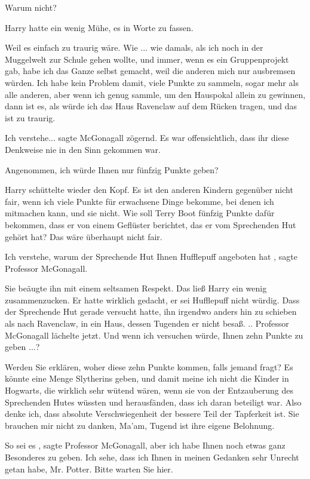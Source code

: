 \glqq Warum nicht?\grqq{}

Harry hatte ein wenig Mühe, es in Worte zu fassen.

\glqq Weil es einfach zu traurig wäre. Wie ... wie damals, als ich noch in der
Muggelwelt zur Schule gehen wollte, und immer, wenn es ein Gruppenprojekt gab,
habe ich das Ganze selbst gemacht, weil die anderen mich nur ausbremsen würden.
Ich habe kein Problem damit, viele Punkte zu sammeln, sogar mehr als alle
anderen, aber wenn ich genug sammle, um den Hauspokal allein zu gewinnen, dann
ist es, als würde ich das Haus Ravenclaw auf dem Rücken tragen, und das ist zu
traurig.\grqq{}

\glqq Ich verstehe...\grqq{} sagte McGonagall zögernd. Es war offensichtlich,
dass ihr diese Denkweise nie in den Sinn gekommen war.

\glqq Angenommen, ich würde Ihnen nur fünfzig Punkte geben?\grqq{}

Harry schüttelte wieder den Kopf. \glqq Es ist den anderen Kindern gegenüber
nicht fair, wenn ich viele Punkte für erwachsene Dinge bekomme, bei denen ich
mitmachen kann, und sie nicht. Wie soll Terry Boot fünfzig Punkte dafür
bekommen, dass er von einem Geflüster berichtet, das er vom Sprechenden Hut
gehört hat? Das wäre überhaupt nicht fair.\grqq{}

\glqq Ich verstehe, warum der Sprechende Hut Ihnen Hufflepuff angeboten
hat\grqq{} , sagte Professor McGonagall.

Sie beäugte ihn mit einem seltsamen Respekt. Das ließ Harry ein wenig
zusammenzucken. Er hatte wirklich gedacht, er sei Hufflepuff nicht würdig. Dass
der Sprechende Hut gerade versucht hatte, ihn irgendwo anders hin zu schieben
als nach Ravenclaw, in ein Haus, dessen Tugenden er nicht besaß. .. Professor
McGonagall lächelte jetzt. \glqq Und wenn ich versuchen würde, Ihnen zehn Punkte
zu geben ...?\grqq{}

\glqq Werden Sie erklären, woher diese zehn Punkte kommen, falls jemand fragt?
Es könnte eine Menge Slytherins geben, und damit meine ich nicht die Kinder in
Hogwarts, die wirklich sehr wütend wären, wenn sie von der Entzauberung des
Sprechenden Hutes wüssten und herausfänden, dass ich daran beteiligt war. Also
denke ich, dass absolute Verschwiegenheit der bessere Teil der Tapferkeit ist.
Sie brauchen mir nicht zu danken, Ma'am, Tugend ist ihre eigene
Belohnung.\grqq{}

\glqq So sei es\grqq{} , sagte Professor McGonagall, \glqq aber ich habe Ihnen
noch etwas ganz Besonderes zu geben. Ich sehe, dass ich Ihnen in meinen Gedanken
sehr Unrecht getan habe, Mr. Potter. Bitte warten Sie hier.\grqq{}


